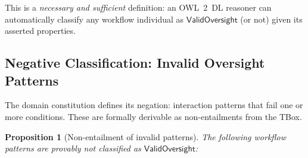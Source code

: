 \documentclass[11pt]{article}
\newtheorem{proposition}{Proposition}[section]
\begin{document}
This is a \emph{necessary and sufficient} definition: an OWL~2~DL reasoner can automatically classify any workflow individual as $\mathsf{ValidOversight}$ (or not) given its asserted properties.

\subsection{Negative Classification: Invalid Oversight Patterns}
\label{sec:negative}

The domain constitution defines its negation: interaction patterns that fail one or more conditions.
These are formally derivable as non-entailments from the TBox.

\begin{proposition}[Non-entailment of invalid patterns]
\label{prop:negative}
The following workflow patterns are provably not classified as $\mathsf{ValidOversight}$:
\end{proposition}
\end{document}
